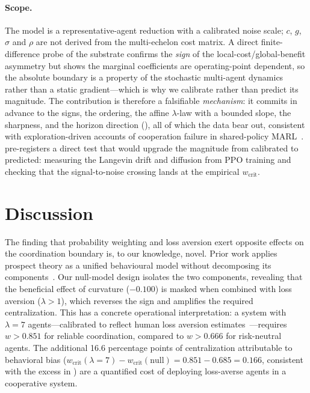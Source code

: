 \documentclass[11pt]{article}
\newcommand{\wcrit}{w_{\mathrm{crit}}}
\begin{document}
\paragraph{Scope.} The model is a representative-agent reduction with a
calibrated noise scale; $c$, $g$, $\sigma$ and $\rho$ are not derived from
the multi-echelon cost matrix. A direct finite-difference probe of the
substrate confirms the \emph{sign} of the local-cost/global-benefit
asymmetry but shows the marginal coefficients are operating-point dependent,
so the absolute boundary is a property of the stochastic multi-agent
dynamics rather than a static gradient---which is why we calibrate rather
than predict its magnitude. The contribution is therefore a falsifiable
\emph{mechanism}: it commits in advance to the signs, the ordering, the
affine $\lambda$-law with a bounded slope, the sharpness, and the horizon
direction (), all of which the data bear out, consistent
with exploration-driven accounts of cooperation failure in shared-policy
MARL~\citep{weng2026}.  pre-registers a direct test
that would upgrade the magnitude from calibrated to predicted: measuring the
Langevin drift and diffusion from PPO training and checking that the
signal-to-noise crossing lands at the empirical $\wcrit$.

\section{Discussion}
\label{sec:discussion}

The finding that probability weighting and loss aversion exert opposite
effects on the coordination boundary is, to our knowledge, novel.
Prior work applies prospect theory as a unified behavioural model without
decomposing its components~\citep{lalmohammed2025,anon2024risk}.
Our null-model design isolates the two components, revealing that the
beneficial effect of curvature ($-0.100$) is masked when combined with
loss aversion ($\lambda{>}1$), which reverses the sign and amplifies the
required centralization.
This has a concrete operational interpretation: a system with $\lambda{=}7$
agents---calibrated to reflect human loss aversion
estimates~\citep{tversky1992}---requires $w > 0.851$ for reliable
coordination, compared to $w > 0.666$ for risk-neutral agents.
The additional 16.6 percentage points of centralization attributable to
behavioral bias ($\wcrit(\lambda{=}7) - \wcrit(\text{null}) =
0.851 - 0.685 = 0.166$, consistent with the excess in
) are a quantified cost of deploying loss-averse
agents in a cooperative system.
\end{document}
